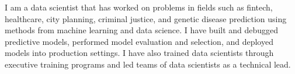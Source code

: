 

\begin{cvparagraph}
I am a data scientist that has worked on problems in fields such as fintech, healthcare, city planning, criminal justice,
and genetic disease prediction using methods from machine learning and data science. I have built and debugged predictive
models, performed model evaluation and selection, and deployed models into production settings. I have also trained
data scientists through executive training programs and led teams of data scientists as a technical lead.
\end{cvparagraph}
